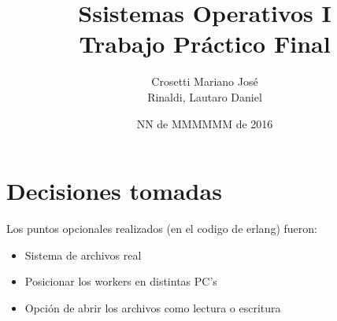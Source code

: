\documentclass[11pt]{article}
\begin{document}
\title{Ssistemas Operativos I\\ 
        Trabajo Pr\'actico Final}
\author{Crosetti Mariano Jos\'e\\Rinaldi, Lautaro Daniel}
\date{NN de MMMMMM de 2016}
\maketitle
\newpage

\section{Decisiones tomadas}

Los puntos opcionales realizados (en el codigo de erlang)  fueron:
\begin{itemize}
\item Sistema de archivos real
\item Posicionar los workers en distintas PC's
\item Opción de abrir los archivos como lectura o escritura
\end{itemize}
\end{document}
